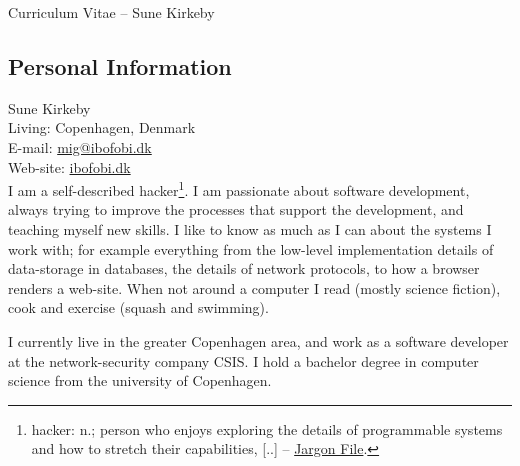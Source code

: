 \documentclass[margin,line,a4paper]{resume}
\begin{document}
{\sc \Large Curriculum Vitae -- Sune Kirkeby}
\begin{resume}

\section{\mysidestyle Personal Information}\vspace{1mm}
Sune Kirkeby \\
Living: Copenhagen, Denmark \\
E-mail: \href{mailto:mig@ibofobi.dk}{mig@ibofobi.dk} \\
Web-site: \href{http://ibofobi.dk/}{ibofobi.dk}\\

I am a self-described hacker\footnote{hacker: n.;  person who enjoys exploring
the details of programmable systems and how to stretch their capabilities,
[..] -- \href{http://www.catb.org/jargon/html/H/hacker.html}{Jargon File}.}.
I am passionate about software development, always trying to improve the
processes that support the development, and teaching myself new skills. I like
to know as much as I can about the systems I work with; for example everything
from the low-level implementation details of data-storage in databases, the
details of network protocols, to how a browser renders a web-site.
When not around a computer I read (mostly science fiction), cook and exercise
(squash and swimming).

I currently live in the greater Copenhagen area, and work as a software
developer at the network-security company CSIS. I hold a bachelor degree in
computer science from the university of Copenhagen.


\end{resume}
\end{document}

